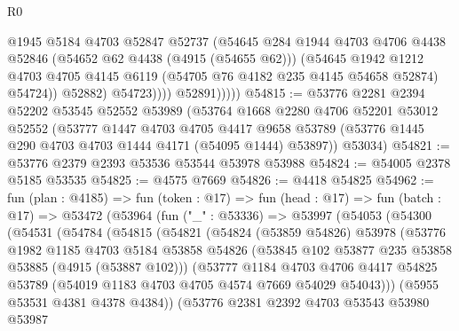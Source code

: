 \begin{lexlean}{R0}
\begin{coremodule}
                        @1945
                        @5184
                        @4703
                        @52847
                        @52737
                        (@54645
                          @284
                          @1944
                          @4703
                          @4706
                          @4438
                          @52846
                          (@54652 @62 @4438 (@4915 (@54655 @62)))
                          (@54645
                            @1942
                            @1212
                            @4703
                            @4705
                            @4145
                            @6119
                            (@54705 @76 @4182 @235 @4145 @54658 @52874)
                            @54724))
                        @52882)
                      @54723))))
              @52891)))))
@54815 := @53776
    @2281
    @2394
    @52202
    @53545
    @52552
    @53989
    (@53764
      @1668
      @2280
      @4706
      @52201
      @53012
      @52552
      (@53777
        @1447
        @4703
        @4705
        @4417
        @9658
        @53789
        (@53776 @1445 @290 @4703 @4703 @1444 @4171 (@54095 @1444) @53897))
      @53034)
@54821 := @53776 @2379 @2393 @53536 @53544 @53978 @53988
@54824 := @54005 @2378 @5185 @53535
@54825 := @4575 @7669
@54826 := @4418 @54825
@54962 := fun (plan : @4185) =>
  fun (token : @17) =>
  fun (head : @17) =>
  fun (batch : @17) =>
  @53472
    (@53964
      (fun ("_" : @53336) =>
      @53997
        (@54053
          (@54300
            (@54531
              (@54784
                (@54815
                  (@54821
                    (@54824
                      (@53859 @54826)
                      @53978
                      (@53776
                        @1982
                        @1185
                        @4703
                        @5184
                        @53858
                        @54826
                        (@53845 @102 @53877 @235 @53858 @53885 (@4915 (@53887 @102)))
                        (@53777
                          @1184
                          @4703
                          @4706
                          @4417
                          @54825
                          @53789
                          (@54019 @1183 @4703 @4705 @4574 @7669 @54029 @54043)))
                      (@5955 @53531 @4381 @4378 @4384))
                    (@53776
                      @2381
                      @2392
                      @4703
                      @53543
                      @53980
                      @53987

\end{coremodule}
\end{lexlean}
